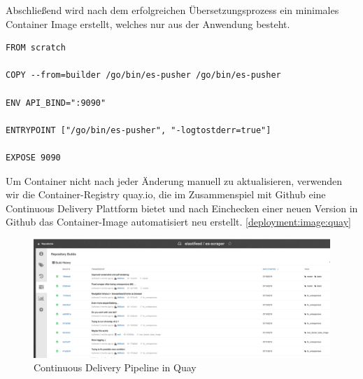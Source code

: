 Abschließend wird nach dem erfolgreichen Übersetzungsprozess ein minimales Container Image erstellt, welches nur aus der Anwendung besteht.

\begin{verbatim}
FROM scratch

COPY --from=builder /go/bin/es-pusher /go/bin/es-pusher

ENV API_BIND=":9090"

ENTRYPOINT ["/go/bin/es-pusher", "-logtostderr=true"]

EXPOSE 9090
\end{verbatim}

Um Container nicht nach jeder Änderung manuell zu aktualisieren, verwenden wir die Container-Registry quay.io, die im Zusammenspiel mit Github eine Continuous Delivery Plattform bietet und nach Einchecken einer neuen Version in Github das Container-Image automatisiert neu erstellt. \autoref{deployment:image:quay}

\begin{figure}[t]
  \centering
  \includegraphics[width=\linewidth]{images/quay.png}
  \caption{Continuous Delivery Pipeline in Quay}
  \label{deployment:image:quay}
\end{figure}

